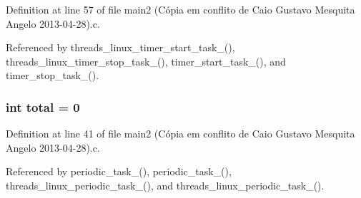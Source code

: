 Definition at line 57 of file main2 (\-Cópia em conflito de Caio Gustavo Mesquita Angelo 2013-\/04-\/28).\-c.



Referenced by threads\-\_\-linux\-\_\-timer\-\_\-start\-\_\-task\-\_(), threads\-\_\-linux\-\_\-timer\-\_\-stop\-\_\-task\-\_(), timer\-\_\-start\-\_\-task\-\_(), and timer\-\_\-stop\-\_\-task\-\_().

\hypertarget{main2_01_07C_xC3_xB3pia_01em_01conflito_01de_01Caio_01Gustavo_01Mesquita_01Angelo_012013-04-28_08_8c_ac7af894858cf396a219d632f40afdc8d}{
\subsubsection[{total}]{\setlength{\rightskip}{0pt plus 5cm}int total = 0}}\label{main2_01_07C_xC3_xB3pia_01em_01conflito_01de_01Caio_01Gustavo_01Mesquita_01Angelo_012013-04-28_08_8c_ac7af894858cf396a219d632f40afdc8d}


Definition at line 41 of file main2 (\-Cópia em conflito de Caio Gustavo Mesquita Angelo 2013-\/04-\/28).\-c.



Referenced by periodic\-\_\-task\-\_(), periodic\-\_\-task\-\_(), threads\-\_\-linux\-\_\-periodic\-\_\-task\-\_(), and threads\-\_\-linux\-\_\-periodic\-\_\-task\-\_().

